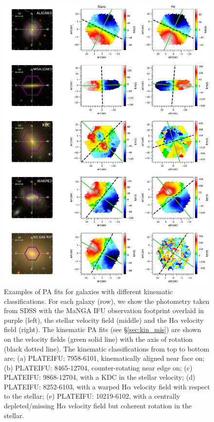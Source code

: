 \begin{figure}
    \centering
	\includegraphics[width=0.93\linewidth]{thesis/latex/misalignment_MaNGA/misalignment_grid.pdf}
    \caption{Examples of PA fits for galaxies with different kinematic classifications. For each galaxy (row), we show the photometry taken from SDSS with the MaNGA IFU observation footprint overlaid in purple (left), the stellar velocity field (middle) and the H$\alpha$ velocity field (right). The kinematic PA fits (see \S\ref{sec:kin_mis}) are shown on the velocity fields (green solid line) with the axis of rotation (black dotted line). The kinematic classifications from top to bottom are; (a) PLATEIFU: 7958-6101, kinematically aligned near face on; (b) PLATEIFU: 8465-12704, counter-rotating near edge on; (c) PLATEIFU: 9868-12704, with a KDC in the stellar velocity; (d) PLATEIFU: 8252-6103, with a warped H$\alpha$ velocity field with respect to the stellar; (e) PLATEIFU: 10219-6102, with a centrally depleted/missing H$\alpha$ velocity field but coherent rotation in the stellar.}
    \label{fig:mis_grid}
\end{figure}

